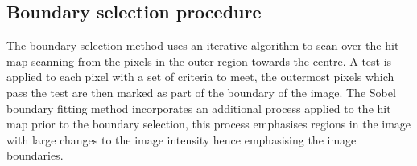 
\subsection {Boundary selection procedure}
The boundary selection method uses an iterative algorithm to scan over the hit map scanning from the pixels in the outer region towards the centre. A test is applied to each pixel with a set of criteria to meet, the outermost pixels which pass the test are then marked as part of the boundary of the image. The Sobel boundary fitting method incorporates an additional process applied to the hit map prior to the boundary selection, this process emphasises regions in the image with large changes to the image intensity hence emphasising the image boundaries.







